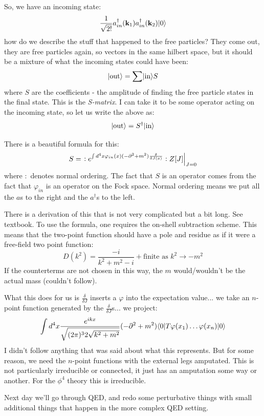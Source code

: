 So, we have an incoming state:
\begin{equation}
    \frac{1}{\sqrt{2!}}a^\dagger_{in}(\mathbf{k}_1)a_{in}^\dagger(\mathbf{k}_2)\lvert 0 \rangle
\end{equation}
how do we describe the stuff that happened to the free particles? They come out, they are free particles again, so vectors in the same hilbert space, but it should be a mixture of what the incoming states could have been:
\begin{equation}
    \lvert \text{out} \rangle = \sum \lvert \text{in} \rangle S
\end{equation}
where $S$ are the coefficients - the amplitude of finding the free particle states in the final state. This is the \emph{S-matrix}. I can take it to be some operator acting on the incoming state, so let us write the above as:
\begin{equation}
    \lvert \text{out} \rangle = S^\dagger \lvert \text{in} \rangle
\end{equation}

There is a beautiful formula for this:
\begin{equation}
    S = \left. :e^{\int d^4x \varphi_{in}(x)(-\p^2 + m^2)\frac{\delta}{\delta J(x)}}:Z[J]\right|_{J = 0}
\end{equation}
where $:$ denotes normal ordering. The fact that $S$ is an operator comes from the fact that $\varphi_{in}$ is an operator on the Fock space. Normal ordering means we put all the $a$s to the right and the $a^\dag$s to the left.

There is a derivation of this that is not very complicated but a bit long. See textbook. To use the formula, one requires the on-shell subtraction scheme. This means that the two-point function should have a pole and residue as if it were a free-field two point function:
\begin{equation}
    D(k^2) = \frac{-i}{k^2 + m^2 - i} + \text{finite as $k^2 \to -m^2$}
\end{equation}
If the counterterms are not chosen in this way, the $m$ would/wouldn't be the actual mass (couldn't follow).

What this does for us is $\frac{\delta}{\delta J}$ inserts a $\varphi$ into the expectation value... we take an $n$-point function generated by the $\frac{\delta}{\delta J}$s... we project:
\begin{equation}
    \int d^4x \frac{e^{ikx}}{\sqrt{(2\pi)^3 2\sqrt{k^2 + m^2}}}(-\p^2 + m^2)\bra{0}T\varphi(x_1) \ldots \varphi(x_n)\ket{0}
\end{equation}
I didn't follow anything that was said about what this represents. But for some reason, we need the $n$-point functions with the external legs amputated. This is not particularly irreducible or connected, it just has an amputation some way or another. For the $\phi^4$ theory this is irreducible.

Next day we'll go through QED, and redo some perturbative things with small additional things that happen in the more complex QED setting.
